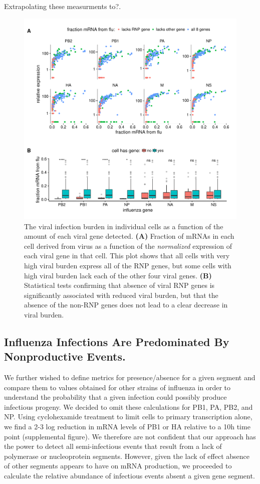 \documentclass[9pt,lineno]{elife}
\begin{document}
Extrapolating these measurments to?.

\begin{figure}
\includegraphics[width=\linewidth]{figures/p_flu_burden_flu_gene_merge.pdf}
\caption{\label{fig:fluburdenbyflugene}
The viral infection burden in individual cells as a function of the amount of each viral gene detected.
{\bf (A)} 
Fraction of mRNAs in each cell derived from virus as a function of the \emph{normalized} expression of each viral gene in that cell.
This plot shows that all cells with very high viral burden express all of the RNP genes, but some cells with high viral burden lack each of the other four viral genes.
{\bf (B)}
Statistical tests confirming that absence of viral RNP genes is significantly associated with reduced viral burden, but that the absence of the non-RNP genes does not lead to a clear decrease in viral burden.
}
\end{figure}

\subsection{Influenza Infections Are Predominated By Nonproductive Events.}
	We further wished to define metrics for presence/absence for a given segment and compare them to values obtained for other strains of influenza in order to understand the probability that a given infection could possibly produce infectious progeny. We decided to omit these calculations for PB1, PA, PB2, and NP. Using cyclohexamide treatment to limit cells to primary transcription alone, we find a 2-3 log reduction in mRNA levels of PB1 or HA relative to a 10h time point (supplemental figure). We therefore are not confident that our approach has the power to detect all semi-infectious events that result from a lack of polymerase or nucleoprotein segments. However, given the lack of effect absence of other segments appears to have on mRNA production, we proceeded to calculate the relative abundance of infectious events absent a given gene segment. 
\end{document}
